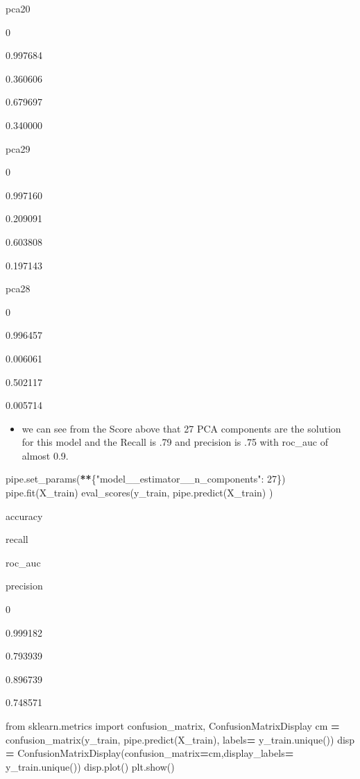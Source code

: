 \documentclass[
]{article}
\newenvironment{Shaded}{\begin{snugshade}}{\end{snugshade}}
\newcommand{\DecValTok}[1]{\textcolor[rgb]{0.00,0.00,0.81}{#1}}
\newcommand{\ImportTok}[1]{#1}
\newcommand{\NormalTok}[1]{#1}
\newcommand{\OperatorTok}[1]{\textcolor[rgb]{0.81,0.36,0.00}{\textbf{#1}}}
\newcommand{\StringTok}[1]{\textcolor[rgb]{0.31,0.60,0.02}{#1}}
\providecommand{\tightlist}{%
  \setlength{\itemsep}{0pt}\setlength{\parskip}{0pt}}
\begin{document}
pca20

0

0.997684

0.360606

0.679697

0.340000

pca29

0

0.997160

0.209091

0.603808

0.197143

pca28

0

0.996457

0.006061

0.502117

0.005714

\begin{itemize}
\tightlist
\item
  we can see from the Score above that 27 PCA components are the
  solution for this model and the Recall is .79 and precision is .75
  with roc\_auc of almost 0.9.
\end{itemize}

\begin{Shaded}
\begin{Highlighting}[]
\NormalTok{pipe.set\_params(}\OperatorTok{**}\NormalTok{\{}\StringTok{"model\_\_estimator\_\_n\_components"}\NormalTok{: }\DecValTok{27}\NormalTok{\})}
\NormalTok{pipe.fit(X\_train)}
\NormalTok{eval\_scores(y\_train, pipe.predict(X\_train) )}
\end{Highlighting}
\end{Shaded}

accuracy

recall

roc\_auc

precision

0

0.999182

0.793939

0.896739

0.748571

\begin{Shaded}
\begin{Highlighting}[]
\ImportTok{from}\NormalTok{ sklearn.metrics }\ImportTok{import}\NormalTok{ confusion\_matrix, ConfusionMatrixDisplay}
\NormalTok{cm }\OperatorTok{=}\NormalTok{ confusion\_matrix(y\_train, pipe.predict(X\_train), labels}\OperatorTok{=}\NormalTok{ y\_train.unique())}
\NormalTok{disp }\OperatorTok{=}\NormalTok{ ConfusionMatrixDisplay(confusion\_matrix}\OperatorTok{=}\NormalTok{cm,display\_labels}\OperatorTok{=}\NormalTok{ y\_train.unique())}
\NormalTok{disp.plot()}
\NormalTok{plt.show()}
\end{Highlighting}
\end{Shaded}
\end{document}
